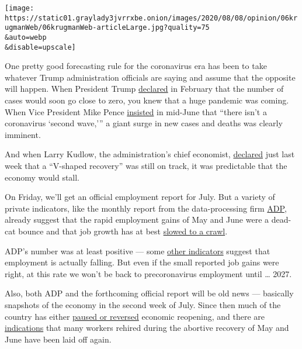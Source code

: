\texttt{[image: https://static01.graylady3jvrrxbe.onion/images/2020/08/08/opinion/06krugmanWeb/06krugmanWeb-articleLarge.jpg?quality=75\\\&auto=webp\\\&disable=upscale]}

One pretty good forecasting rule for the coronavirus era has been to
take whatever Trump administration officials are saying and assume that
the opposite will happen. When President Trump
\href{https://www.cbsnews.com/news/timeline-president-donald-trump-changing-statements-on-coronavirus/}{declared}
in February that the number of cases would soon go close to zero, you
knew that a huge pandemic was coming. When Vice President Mike Pence
\href{https://www.wsj.com/articles/there-isnt-a-coronavirus-second-wave-11592327890}{insisted}
in mid-June that ``there isn't a coronavirus `second wave,''' a giant
surge in new cases and deaths was clearly imminent.

And when Larry Kudlow, the administration's chief economist,
\href{https://www.foxbusiness.com/economy/kudlow-maintains-v-shaped-economic-recovery-still-intact-despite-coronavirus-resurgence}{declared}
just last week that a ``V-shaped recovery'' was still on track, it was
predictable that the economy would stall.

On Friday, we'll get an official employment report for July. But a
variety of private indicators, like the monthly report from the
data-processing firm \href{https://adpemploymentreport.com/}{ADP},
already suggest that the rapid employment gains of May and June were a
dead-cat bounce and that job growth has at best
\href{https://fred.stlouisfed.org/series/NPPTTL}{slowed to a crawl}.

ADP's number was at least positive --- some
\href{https://twitter.com/ernietedeschi/status/1290971597508169729}{other
indicators} suggest that employment is actually falling. But even if the
small reported job gains were right, at this rate we won't be back to
precoronavirus employment until \ldots{} 2027.

Also, both ADP and the forthcoming official report will be old news ---
basically snapshots of the economy in the second week of July. Since
then much of the country has either
\href{https://www.nytimes3xbfgragh.onion/interactive/2020/us/states-reopen-map-coronavirus.html}{paused
or reversed} economic reopening, and there are
\href{https://d3n8a8pro7vhmx.cloudfront.net/prosperousamerica/pages/5561/attachments/original/1596512047/Cornell-JQI-RIWI_Poll_Report_-_Second_Wave_of_Layoffs_Well_Under_Way_-_080420_FINAL.pdf?1596512047}{indications}
that many workers rehired during the abortive recovery of May and June
have been laid off again.

